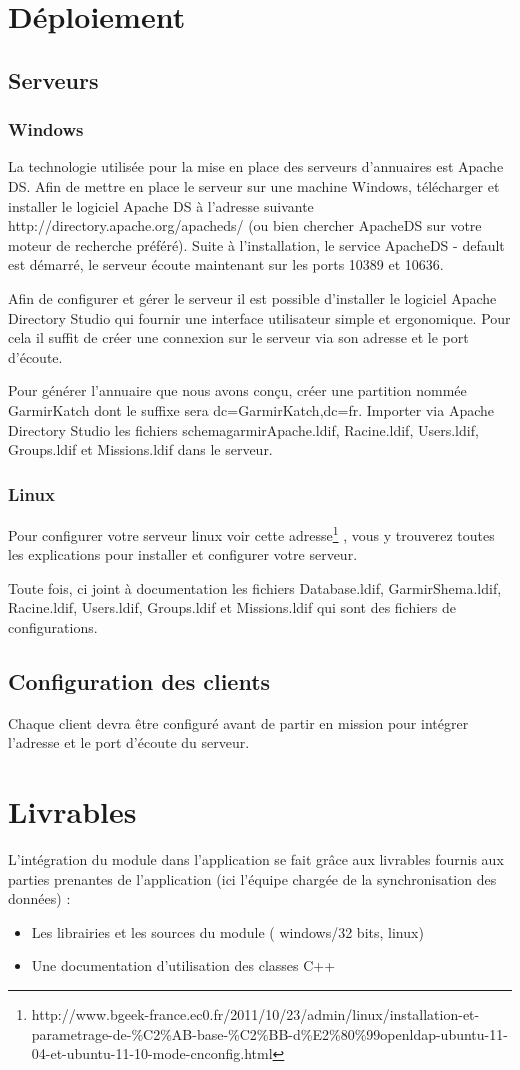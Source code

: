 \documentclass[11pt,fleqn]{report}
\begin{document}
\chapter{Déploiement}
\section{Serveurs}
\subsection{Windows}
La technologie utilisée pour la mise en place des serveurs d’annuaires est Apache DS. Afin de mettre en place le serveur sur une machine Windows, télécharger et installer le logiciel Apache DS à l’adresse suivante http://directory.apache.org/apacheds/ (ou bien chercher ApacheDS sur votre moteur de recherche préféré). Suite à l’installation, le service ApacheDS - default est démarré, le serveur écoute maintenant sur les ports 10389 et 10636.

Afin de configurer et gérer le serveur il est possible d’installer le logiciel Apache Directory Studio qui fournir une interface utilisateur simple et ergonomique. Pour cela il suffit de créer une connexion sur le serveur via son adresse et le port d’écoute.

Pour générer l’annuaire que nous avons conçu, créer une partition nommée GarmirKatch dont le suffixe sera dc=GarmirKatch,dc=fr. Importer via Apache Directory Studio les fichiers schemagarmirApache.ldif, Racine.ldif, Users.ldif, Groups.ldif et Missions.ldif dans le serveur.
\subsection{Linux}
Pour configurer votre serveur linux voir cette adresse\footnote{http://www.bgeek-france.ec0.fr/2011/10/23/admin/linux/installation-et-parametrage-de-\%C2\%AB-base-\%C2\%BB-d\%E2\%80\%99openldap-ubuntu-11-04-et-ubuntu-11-10-mode-cnconfig.html }
, vous y trouverez toutes les explications pour installer et configurer votre serveur.

Toute fois, ci joint à documentation les fichiers Database.ldif, GarmirShema.ldif, Racine.ldif, Users.ldif, Groups.ldif et Missions.ldif qui sont des fichiers de configurations.
\section{Configuration des clients}
Chaque client devra être configuré avant de partir en mission pour intégrer l’adresse et le port d’écoute du serveur. 

\chapter{Livrables}
L’intégration du module dans l’application se fait grâce aux livrables fournis aux parties prenantes de l’application (ici l’équipe chargée de la synchronisation des données) :
\begin{itemize}
\item Les librairies et les sources du module ( windows/32 bits, linux)
\item Une documentation d’utilisation des classes C++
\end{itemize}
\end{document}
